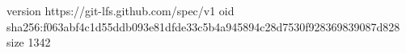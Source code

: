 version https://git-lfs.github.com/spec/v1
oid sha256:f063abf4c1d55ddb093e81dfde33c5b4a945894c28d7530f928369839087d828
size 1342
